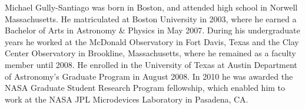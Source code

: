 \documentclass[12pt]{report}	%
\begin{document}
\printindex%



\begin{vita}
Michael Gully-Santiago was born in Boston, and attended high school in Norwell Massachusetts.  He matriculated at Boston University in 2003, where he earned a Bachelor of Arts in Astronomy \& Physics in May 2007.  During his undergraduate years he worked at the McDonald Observatory in Fort Davis, Texas and the Clay Center Observatory in Brookline, Massachusetts, where he remained as a faculty member until 2008.  He enrolled in the University of Texas at Austin Department of Astronomy's Graduate Program in August 2008.  In 2010 he was awarded the NASA Graduate Student Research Program fellowship, which enabled him to work at the NASA JPL Microdevices Laboratory in Pasadena, CA.  
\end{vita}
\end{document}
